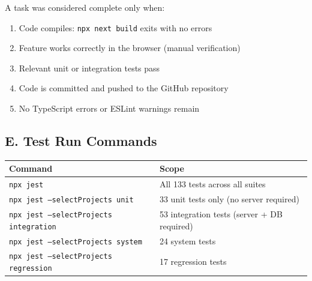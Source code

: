 \documentclass[12pt, a4paper]{article}
\begin{document}
A task was considered complete only when:
\begin{enumerate}[noitemsep]
  \item Code compiles: \texttt{npx next build} exits with no errors
  \item Feature works correctly in the browser (manual verification)
  \item Relevant unit or integration tests pass
  \item Code is committed and pushed to the GitHub repository
  \item No TypeScript errors or ESLint warnings remain
\end{enumerate}

\subsection*{E. Test Run Commands}

\begin{table}[H]
\centering
\begin{tabularx}{\textwidth}{lX}
\toprule
\textbf{Command} & \textbf{Scope} \\
\midrule
\texttt{npx jest}                              & All 133 tests across all suites \\
\texttt{npx jest --selectProjects unit}        & 33 unit tests only (no server required) \\
\texttt{npx jest --selectProjects integration} & 53 integration tests (server + DB required) \\
\texttt{npx jest --selectProjects system}      & 24 system tests \\
\texttt{npx jest --selectProjects regression}  & 17 regression tests \\
\bottomrule
\end{tabularx}
\end{table}
\end{document}
